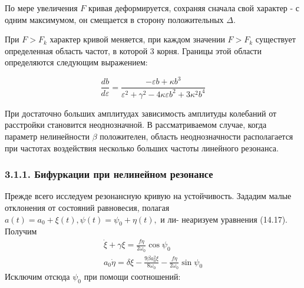 \documentclass[11pt]{article}
\begin{document}
По мере увеличения \(F\) кривая деформируется, сохраняя сначала свой
характер - с одним максимумом, он смещается в сторону положительных
\(\Delta\).

При \(F > F_k\) характер кривой меняется, при каждом значении
\(F > F_k\) существует определенная область частот, в которой 3 корня.
Границы этой области определяются следующим выражением:

\begin{equation}
\frac{d b}{d \varepsilon}=\dfrac{-\varepsilon b+ \kappa b^{3}}{\varepsilon^{2}+\gamma ^{2}-4 \kappa \varepsilon b^{2}+3 \kappa^{2} b^{4}}
\end{equation}

При достаточно больших амплитудах зависимость амплитуды колебаний от
расстройки становится неоднозначной. В рассматриваемом случае, когда
параметр нелинейности \(\beta\) положителен, область неоднозначности
располагается при частотах воздействия несколько больших частоты
линейного резонанса.

\hypertarget{ux431ux438ux444ux443ux440ux43aux430ux446ux438ux438-ux43fux440ux438-ux43dux435ux43bux438ux43dux435ux439ux43dux43eux43c-ux440ux435ux437ux43eux43dux430ux43dux441ux435}{%
\subsubsection{3.1.1. Бифуркации при нелинейном
резонансе}\label{ux431ux438ux444ux443ux440ux43aux430ux446ux438ux438-ux43fux440ux438-ux43dux435ux43bux438ux43dux435ux439ux43dux43eux43c-ux440ux435ux437ux43eux43dux430ux43dux441ux435}}

Прежде всего исследуем резонансную кривую на устойчивость. Зададим малые
отклонения от состояний равновесия, полагая
\(a(t)=a_{0}+\xi(t), \psi(t)=\psi_{0}+\eta(t),\) и ли- неаризуем
уравнения (14.17). Получим \[
\begin{array}{c}
\dot{\xi}+\gamma \xi=\frac{f \eta}{2 \omega_{0}} \cos \psi_{0} \\
a_{0} \dot{\eta}=\delta \xi-\frac{9 \beta a_{0}^{2} \xi}{8 \omega_{0}}-\frac{f \eta}{2 \omega_{0}} \sin \psi_{0}
\end{array}
\] Исключим отсюда \(\psi_{0}\) при помощи соотношений:
\end{document}
